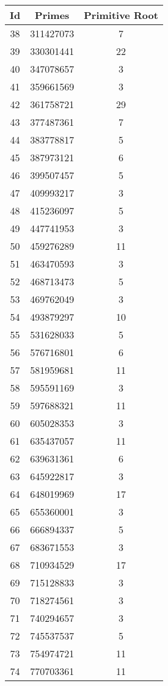 \begin{spacing}{0.97}
\begin{tabular}{ccc}
\toprule
	   Id & Primes & Primitive Root\\
 \midrule
 38 & 311427073 & 7\\
 39 & 330301441 & 22\\
 40 & 347078657 & 3\\
 41 & 359661569 & 3\\
 42 & 361758721 & 29\\
 43 & 377487361 & 7\\
 44 & 383778817 & 5\\
 45 & 387973121 & 6\\
 46 & 399507457 & 5\\
 47 & 409993217 & 3\\
 48 & 415236097 & 5\\
 49 & 447741953 & 3\\
 50 & 459276289 & 11\\
 51 & 463470593 & 3\\
 52 & 468713473 & 5\\
 53 & 469762049 & 3\\
 54 & 493879297 & 10\\
 55 & 531628033 & 5\\
 56 & 576716801 & 6\\
 57 & 581959681 & 11\\
 58 & 595591169 & 3\\
 59 & 597688321 & 11\\
 60 & 605028353 & 3\\
 61 & 635437057 & 11\\
 62 & 639631361 & 6\\
 63 & 645922817 & 3\\
 64 & 648019969 & 17\\
 65 & 655360001 & 3\\
 66 & 666894337 & 5\\
 67 & 683671553 & 3\\
 68 & 710934529 & 17\\
 69 & 715128833 & 3\\
 70 & 718274561 & 3\\
 71 & 740294657 & 3\\
 72 & 745537537 & 5\\
 73 & 754974721 & 11\\
 74 & 770703361 & 11\\
\bottomrule
\end{tabular}
\begin{tabular}{ccc}

\end{tabular}
\end{spacing}

